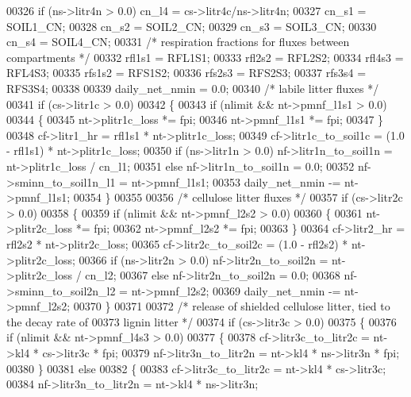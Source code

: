 \begin{DoxyCode}
00326     \textcolor{keywordflow}{if} (ns->litr4n > 0.0) cn\_l4 = cs->litr4c/ns->litr4n;
00327     cn\_s1 = SOIL1\_CN;
00328     cn\_s2 = SOIL2\_CN;
00329     cn\_s3 = SOIL3\_CN;
00330     cn\_s4 = SOIL4\_CN;
00331     \textcolor{comment}{/* respiration fractions for fluxes between compartments */}
00332     rfl1s1 = RFL1S1;
00333     rfl2s2 = RFL2S2;
00334     rfl4s3 = RFL4S3;
00335     rfs1s2 = RFS1S2;
00336     rfs2s3 = RFS2S3;
00337     rfs3s4 = RFS3S4;
00338     
00339     daily\_net\_nmin = 0.0;
00340     \textcolor{comment}{/* labile litter fluxes */}
00341     \textcolor{keywordflow}{if} (cs->litr1c > 0.0)
00342     \{
00343         \textcolor{keywordflow}{if} (nlimit && nt->pmnf\_l1s1 > 0.0)
00344         \{
00345             nt->plitr1c\_loss *= fpi;
00346             nt->pmnf\_l1s1 *= fpi;
00347         \}
00348         cf->litr1\_hr = rfl1s1 * nt->plitr1c\_loss;
00349         cf->litr1c\_to\_soil1c = (1.0 - rfl1s1) * nt->plitr1c\_loss;
00350         if (ns->litr1n > 0.0) nf->litr1n\_to\_soil1n = nt->plitr1c\_loss / cn\_l1;
00351         \textcolor{keywordflow}{else} nf->litr1n\_to\_soil1n = 0.0;
00352         nf->sminn\_to\_soil1n\_l1 = nt->pmnf\_l1s1;
00353         daily\_net\_nmin -= nt->pmnf\_l1s1;
00354     \}
00355 
00356     \textcolor{comment}{/* cellulose litter fluxes */}
00357     \textcolor{keywordflow}{if} (cs->litr2c > 0.0)
00358     \{
00359         \textcolor{keywordflow}{if} (nlimit && nt->pmnf\_l2s2 > 0.0)
00360         \{
00361             nt->plitr2c\_loss *= fpi;
00362             nt->pmnf\_l2s2 *= fpi;
00363         \}
00364         cf->litr2\_hr = rfl2s2 * nt->plitr2c\_loss;
00365         cf->litr2c\_to\_soil2c = (1.0 - rfl2s2) * nt->plitr2c\_loss;
00366         if (ns->litr2n > 0.0) nf->litr2n\_to\_soil2n = nt->plitr2c\_loss / cn\_l2;
00367         \textcolor{keywordflow}{else} nf->litr2n\_to\_soil2n = 0.0;
00368         nf->sminn\_to\_soil2n\_l2 = nt->pmnf\_l2s2;
00369         daily\_net\_nmin -= nt->pmnf\_l2s2;
00370     \}
00371 
00372     \textcolor{comment}{/* release of shielded cellulose litter, tied to the decay rate of}
00373 \textcolor{comment}{    lignin litter */}
00374     \textcolor{keywordflow}{if} (cs->litr3c > 0.0)
00375     \{
00376         \textcolor{keywordflow}{if} (nlimit && nt->pmnf\_l4s3 > 0.0)
00377         \{
00378             cf->litr3c\_to\_litr2c = nt->kl4 * cs->litr3c * fpi;
00379             nf->litr3n\_to\_litr2n = nt->kl4 * ns->litr3n * fpi;
00380         \}
00381         \textcolor{keywordflow}{else}
00382         \{
00383             cf->litr3c\_to\_litr2c = nt->kl4 * cs->litr3c;
00384             nf->litr3n\_to\_litr2n = nt->kl4 * ns->litr3n;

\end{DoxyCode}
